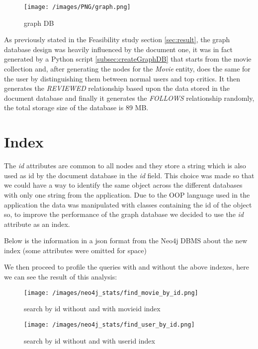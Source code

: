\begin{figure}[H]
\begin{center}
\texttt{[image: /images/PNG/graph.png]}
\caption{graph DB}
\label{fig:graphDB}
\end{center}
\end{figure}

As previously stated in the Feasibility study section \ref{sec:result}, the graph database design was heavily influenced by the document one, it was in fact generated by a Python script \cref{subsec:createGraphDB} that starts from the movie collection and, after generating the nodes for the \emph{Movie} entity, does the same for the user by distinguishing them between normal users and top critics. It then generates the \emph{REVIEWED} relationship based upon the data stored in the document database and finally it generates the \emph{FOLLOWS} relationship randomly, the total storage size of the database is 89 MB.

\section{Index}
The \emph{id} attributes are common to all nodes and they store a string which is also used as id by the document database in the \emph{\textunderscore id} field. This choice was made so that we could have a way to identify the same object across the different databases with only one string from the application. Due to the OOP language used in the application the data was manipulated with classes containing the id of the object so, to improve the performance of the graph database we decided to use the \emph{id} attribute as an index. 

Below is the information in a json format from the Neo4j DBMS about the new index (some attributes were omitted for space)


We then proceed to profile the queries with and without the above indexes, here we can see the result of this analysis: 
\begin{figure}[H]
\begin{center}
\texttt{[image: /images/neo4j\_stats/find\_movie\_by\_id.png]}
\caption{search by id without and with movie\textunderscore id \textunderscore index}
\label{fig:movieId}
\end{center}
\end{figure}

\begin{figure}[H]
\begin{center}
\texttt{[image: /images/neo4j\_stats/find\_user\_by\_id.png]}
\caption{search by id without and with user\textunderscore id \textunderscore index}
\label{fig:userId}
\end{center}
\end{figure}


